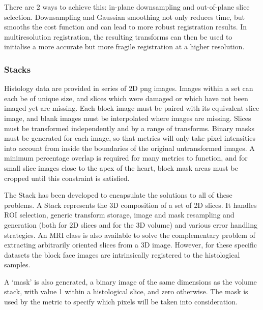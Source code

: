       There are 2 ways to achieve this: in-plane downsampling and out-of-plane slice selection. Downsampling and Gaussian smoothing not only reduces time, but smooths the cost function and can lead to more robust registration results. In multiresolution registration, the resulting transforms can then be used to initialise a more accurate but more fragile registration at a higher resolution.
    
    
    \subsubsection{Stacks} %
    \label{ssub:stacks}
            Histology data are provided in series of 2D png images. Images within a set can each be of unique size, and slices which were damaged or which have not been imaged yet are missing. Each block image must be paired with its equivalent slice image, and blank images must be interpolated where images are missing. Slices must be transformed independently and by a range of transforms. Binary masks must be generated for each image, so that metrics will only take pixel intensities into account from inside the boundaries of the original untransformed images. A minimum percentage overlap is required for many metrics to function, and for small slice images close to the apex of the heart, block mask areas must be cropped until this constraint is satisfied.

            The Stack has been developed to encapsulate the solutions to all of these problems. A Stack represents the 3D composition of a set of 2D slices. It handles ROI selection, generic transform storage, image and mask resampling and generation (both for 2D slices and for the 3D volume) and various error handling strategies. An MRI class is also available to solve the complementary problem of extracting arbitrarily oriented slices from a 3D image. However, for these specific datasets the block face images are intrinsically registered to the histological samples.
    
      A `mask' is also generated, a binary image of the same dimensions as the volume stack, with value 1 within a histological slice, and zero otherwise. The mask is used by the metric to specify which pixels will be taken into consideration.
    
